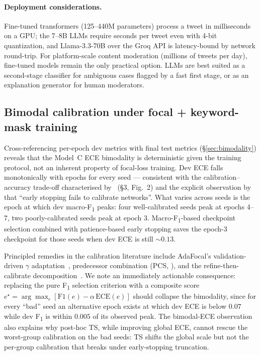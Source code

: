 \paragraph{Deployment considerations.}
Fine-tuned transformers (125--440M parameters) process a tweet in milliseconds on a GPU; the 7--8B LLMs require seconds per tweet even with 4-bit quantization, and Llama-3.3-70B over the Groq API is latency-bound by network round-trip. For platform-scale content moderation (millions of tweets per day), fine-tuned models remain the only practical option. LLMs are best suited as a second-stage classifier for ambiguous cases flagged by a fast first stage, or as an explanation generator for human moderators.

\subsection{Bimodal calibration under focal + keyword-mask training}
\label{sec:discussion:bimodality}

Cross-referencing per-epoch dev metrics with final test metrics (\S\ref{sec:bimodality}) reveals that the Model~C ECE bimodality is deterministic given the training protocol, not an inherent property of focal-loss training. Dev ECE falls monotonically with epochs for every seed --- consistent with the calibration--accuracy trade-off characterised by~\citet{mukhoti2020calibrating} (\S3, Fig.~2) and the explicit observation by~\citet{tao2023pcs} that ``early stopping fails to calibrate networks''. What varies across seeds is the epoch at which dev macro-F\textsubscript{1} peaks: four well-calibrated seeds peak at epochs 4--7, two poorly-calibrated seeds peak at epoch 3. Macro-F\textsubscript{1}-based checkpoint selection combined with patience-based early stopping saves the epoch-3 checkpoint for those seeds when dev ECE is still $\sim 0.13$.

Principled remedies in the calibration literature include AdaFocal's validation-driven $\gamma$ adaptation~\citep{ghosh2022adafocal}, predecessor combination (PCS, \citet{tao2023pcs}), and the refine-then-calibrate decomposition~\citep{holzmuller2025refine}. We note an immediately actionable consequence: replacing the pure F\textsubscript{1} selection criterion with a composite score $e^\star = \arg\max_e [\mathrm{F1}(e) - \alpha\,\mathrm{ECE}(e)]$ should collapse the bimodality, since for every ``bad'' seed an alternative epoch exists at which dev ECE is below $0.07$ while dev F\textsubscript{1} is within $0.005$ of its observed peak. The bimodal-ECE observation also explains why post-hoc TS, while improving global ECE, cannot rescue the worst-group calibration on the bad seeds: TS shifts the global scale but not the per-group calibration that breaks under early-stopping truncation.

